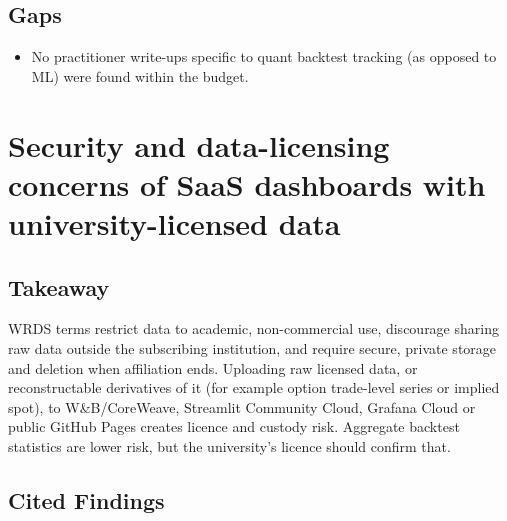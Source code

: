 \documentclass{article}
\begin{document}
\subsection{Gaps}

\begin{itemize}

\item No practitioner write-ups specific to quant backtest tracking (as opposed to ML) were found within the budget.

\end{itemize}

\section{Security and data-licensing concerns of SaaS dashboards with university-licensed data}

\subsection{Takeaway}

WRDS terms restrict data to academic, non-commercial use, discourage sharing raw data outside the subscribing institution, and require secure, private storage and deletion when affiliation ends. Uploading raw licensed data, or reconstructable derivatives of it (for example option trade-level series or implied spot), to W\&B/\allowbreak{}CoreWeave, Streamlit Community Cloud, Grafana Cloud or public GitHub Pages creates licence and custody risk. Aggregate backtest statistics are lower risk, but the university's licence should confirm that.

\subsection{Cited Findings}
\end{document}
